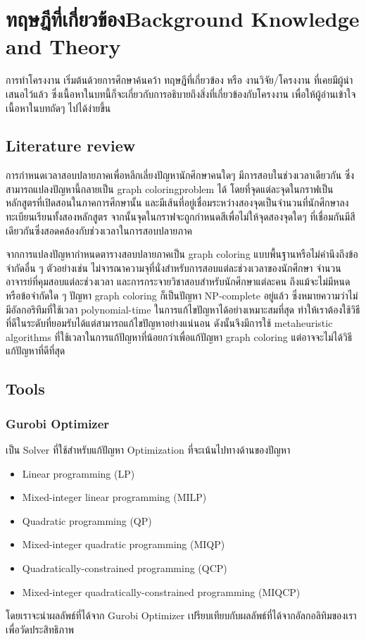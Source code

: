 \chapter{\ifcpe ทฤษฎีที่เกี่ยวข้อง\else Background Knowledge and Theory\fi}
การทำโครงงาน เริ่มต้นด้วยการศึกษาค้นคว้า ทฤษฎีที่เกี่ยวข้อง หรือ งานวิจัย/โครงงาน ที่เคยมีผู้นำเสนอไว้แล้ว ซึ่งเนื้อหาในบทนี้ก็จะเกี่ยวกับการอธิบายถึงสิ่งที่เกี่ยวข้องกับโครงงาน เพื่อให้ผู้อ่านเข้าใจเนื้อหาในบทถัดๆ ไปได้ง่ายขึ้น
\section{Literature review}
การกำหนดเวลาสอบปลายภาคเพื่อหลีกเลี่ยงปัญหานักศึกษาคนใดๆ มีการสอบในช่วงเวลาเดียวกัน ซึ่งสามารถแปลงปัญหานี้กลายเป็น graph coloringproblem ได้ 
โดยที่จุดแต่ละจุดในกราฟเป็นหลักสูตรที่เปิดสอนในภาคการศึกษานั้น 
และมีเส้นที่อยู่เชื่อมระหว่างสองจุดเป็นจำนวนที่นักศึกษาลงทะเบียนเรียนทั้งสองหลักสูตร จากนั้นจุดในกราฟจะถูกกำหนดสีเพื่อไม่ให้จุดสองจุดใดๆ 
ที่เชื่อมกันมีสีเดียวกันซึ่งสอดคล้องกับช่วงเวลาในการสอบปลายภาค

จากการแปลงปัญหากำหนดตารางสอบปลายภาคเป็น graph coloring\cite{aia} แบบพื้นฐานหรือไม่คำนึงถึงข้อจำกัดอื่น ๆ 
ตัวอย่างเช่น ไม่จารณาความจุที่นั่งสำหรับการสอบแต่ละช่วงเวลาของนักศึกษา จำนวนอาจารย์ที่คุมสอบแต่ละช่วงเวลา และการกระจายวิชาสอบสำหรับนักศึกษาแต่ละคน 
ถึงแม้จะไม่มีหนดหรือข้อจำกัดใด ๆ ปัญหา graph coloring ก็เป็นปัญหา NP-complete อยู่แล้ว 
ซึ่งหมายความว่าไม่มีอัลกอริทึมที่ใช้เวลา polynomial-time ในการแก้ไขปัญหาได้อย่างเหมาะสมที่สุด 
ทำให้เราต้องใช้วิธีที่ดีในระดับที่ยอมรับได้แต่สามารถแก้ไขปัญหาอย่างแน่นอน ดังนั้นจึงมีการใช้ metaheuristic algorithms ที่ใช้เวลาในการแก้ปัญหาที่น้อยกว่าเพื่อแก้ปัญหา graph coloring แต่อาจจะไม่ได้วิธีแก้ปัญหาที่ดีที่สุด
\section{Tools}
\subsection{Gurobi Optimizer}
  เป็น Solver ที่ใช้สำหรับแก้ปัญหา Optimization ที่จะเน้นไปทางด้านของปัญหา 
\begin{itemize}
  \item Linear programming (LP)
  \item Mixed-integer linear programming (MILP)
  \item Quadratic programming (QP)
  \item Mixed-integer quadratic programming (MIQP)
  \item Quadratically-constrained programming (QCP)
  \item Mixed-integer quadratically-constrained programming (MIQCP)
\end{itemize}
โดยเราจะนำผลลัพธ์ที่ได้จาก Gurobi Optimizer เปรียบเทียบกับผลลัพธ์ที่ได้จากอัลกอลิทิมของเราเพื่อวัดประสิทธิภาพ

